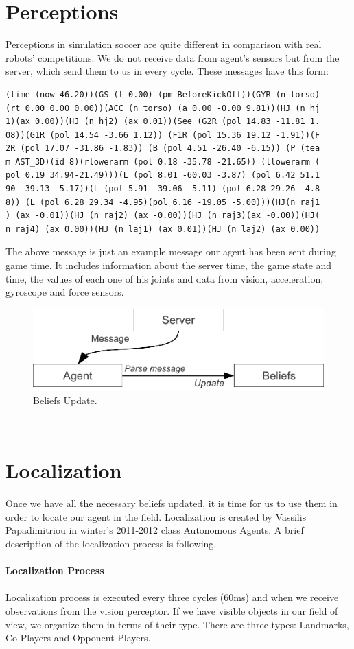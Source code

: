 \section{Perceptions}
Perceptions in simulation soccer are quite different in comparison with real robots' competitions. We do not receive data from agent's sensors but from the server, which send them to us in every cycle. These messages have this form:\\
\begin{verbatim}
(time (now 46.20))(GS (t 0.00) (pm BeforeKickOff))(GYR (n torso)
(rt 0.00 0.00 0.00))(ACC (n torso) (a 0.00 -0.00 9.81))(HJ (n hj
1)(ax 0.00))(HJ (n hj2) (ax 0.01))(See (G2R (pol 14.83 -11.81 1.
08))(G1R (pol 14.54 -3.66 1.12)) (F1R (pol 15.36 19.12 -1.91))(F
2R (pol 17.07 -31.86 -1.83)) (B (pol 4.51 -26.40 -6.15)) (P (tea
m AST_3D)(id 8)(rlowerarm (pol 0.18 -35.78 -21.65)) (llowerarm (
pol 0.19 34.94-21.49)))(L (pol 8.01 -60.03 -3.87) (pol 6.42 51.1
90 -39.13 -5.17))(L (pol 5.91 -39.06 -5.11) (pol 6.28-29.26 -4.8
8)) (L (pol 6.28 29.34 -4.95)(pol 6.16 -19.05 -5.00)))(HJ(n raj1
) (ax -0.01))(HJ (n raj2) (ax -0.00))(HJ (n raj3)(ax -0.00))(HJ(
n raj4) (ax 0.00))(HJ (n laj1) (ax 0.01))(HJ (n laj2) (ax 0.00))
\end{verbatim}
The above message is just an example message our agent has been sent 
during game time. It includes information about the server time, the game state and time, the values of each one of his joints and data from vision, acceleration, gyroscope and force sensors.
\begin{figure}[htb!]
\centering
  \includegraphics[scale=0.6]{Chapter3/figures/Message.pdf}
  \caption{Beliefs Update.} 
  \label{fig:BeliefsUpdate}
\end{figure}
\\








\section{Localization}
Once we have all the necessary beliefs updated, it is time for us to use them in order to locate our agent in the field. Localization is created by Vassilis Papadimitriou in winter's 2011-2012 class Autonomous Agents. A brief description of the localization process is following.\\
\\
{\bf Localization Process}\\
\\
Localization process is executed every three cycles (60ms) and when we receive observations from the vision perceptor. If we have visible objects in our field of view, we organize them in terms of their type. There are three types: Landmarks, Co-Players and Opponent Players. 

